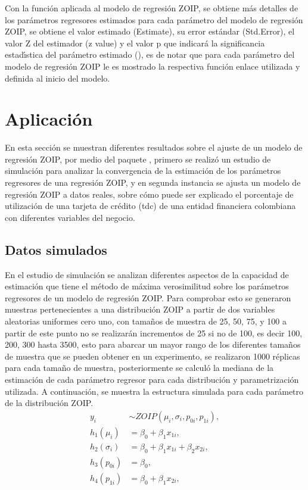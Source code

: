 Con la funci\'{o}n  aplicada al modelo de regresi\'{o}n ZOIP, se obtiene m\'{a}s detalles de los par\'{a}metros regresores estimados para cada par\'{a}metro del modelo de regresi\'{o}n ZOIP, se obtiene el valor estimado (Estimate), su error est\'{a}ndar (Std.Error), el valor Z del estimador (z value) y el valor p que indicar\'{a} la significancia estad\'{\i}stica del par\'{a}metro estimado (), es de notar que para cada par\'{a}metro del modelo de regresi\'{o}n ZOIP le es mostrado la respectiva funci\'{o}n enlace utilizada y definida al inicio del modelo.

\section{Aplicaci\'{o}n}
En esta secci\'{o}n se muestran diferentes resultados sobre el ajuste de un modelo de regresi\'{o}n ZOIP, por medio del paquete , primero se realiz\'{o} un estudio de simulaci\'{o}n para analizar la convergencia de la estimaci\'{o}n de los par\'{a}metros regresores de una regresi\'{o}n ZOIP, y en segunda instancia se ajusta un modelo de regresi\'{o}n ZOIP a datos reales, sobre c\'{o}mo puede ser explicado el porcentaje de utilizaci\'{o}n de una tarjeta de cr\'{e}dito (tdc) de una entidad financiera colombiana con diferentes variables del negocio.

\subsection{Datos simulados}
En el estudio de simulaci\'{o}n se analizan diferentes aspectos de la capacidad de estimaci\'{o}n que tiene el m\'{e}todo de m\'{a}xima verosimilitud sobre los par\'{a}metros regresores de un modelo de regresi\'{o}n ZOIP. Para comprobar esto se generaron muestras pertenecientes a una distribuci\'{o}n ZOIP a partir de dos variables aleatorias uniformes cero uno, con tama\~{n}os de muestra de 25, 50, 75, y 100 a partir de este punto no se realizar\'{a}n incrementos de 25 si no de 100, es decir 100, 200, 300 hasta 3500, esto para abarcar un mayor rango de los diferentes tama\~{n}os de muestra que se pueden obtener en un experimento, se realizaron 1000 r\'{e}plicas para cada tama\~{n}o de muestra, posteriormente se calcul\'{o} la mediana de la estimaci\'{o}n de cada par\'{a}metro regresor para cada distribuci\'{o}n y parametrizaci\'{o}n utilizada. A continuaci\'{o}n, se muestra la estructura simulada para cada par\'{a}metro de la distribuci\'{o}n ZOIP.
\begin{equation}
\begin{split}
y_{i} & \sim ZOIP(\mu_{i},\sigma_{i},p_{0i}, p_{1i}),\\
h_1(\mu_{i}) &=\beta_0+\beta_1x_{1i},\\
h_2(\sigma_{i}) &=\beta_0+\beta_1x_{1i}+\beta_2x_{2i},\\
h_3(p_{0i}) &=\beta_0,\\
h_4(p_{1i}) &=\beta_0+\beta_1x_{2i},
\end{split}
\label{S_eq_reg}
\end{equation}

